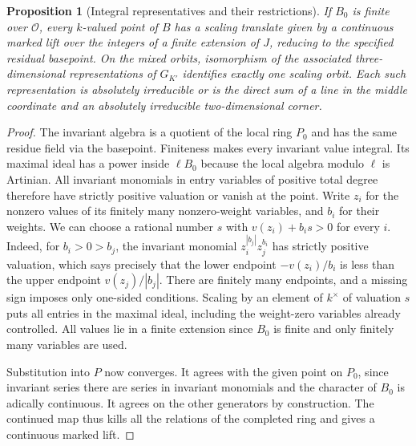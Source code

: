 \documentclass[a4paper,11pt]{article}
\newtheorem{proposition}{Proposition}[section]
\theoremstyle{definition}
\theoremstyle{remark}
\numberwithin{equation}{section}
\newcommand{\OO}{\mathcal O}
\begin{document}
\begin{proposition}[Integral representatives and their restrictions]\label{prop:point39}
If \(B_0\) is finite over \(\OO\), every \(k\)-valued point of \(B\) has a scaling translate given by a continuous marked lift over the integers of a finite extension of \(J\), reducing to the specified residual basepoint. On the mixed orbits, isomorphism of the associated three-dimensional representations of \(G_{K'}\) identifies exactly one scaling orbit. Each such representation is absolutely irreducible or is the direct sum of a line in the middle coordinate and an absolutely irreducible two-dimensional corner.
\end{proposition}
\begin{proof}
The invariant algebra is a quotient of the local ring \(P_0\) and has the same residue field via the basepoint. Finiteness makes every invariant value integral. Its maximal ideal has a power inside \(\ell B_0\) because the local algebra modulo \(\ell\) is Artinian. All invariant monomials in entry variables of positive total degree therefore have strictly positive valuation or vanish at the point. Write \(z_i\) for the nonzero values of its finitely many nonzero-weight variables, and \(b_i\) for their weights. We can choose a rational number \(s\) with \(v(z_i)+b_i s>0\) for every \(i\). Indeed, for \(b_i>0>b_j\), the invariant monomial \(z_i^{|b_j|}z_j^{b_i}\) has strictly positive valuation, which says precisely that the lower endpoint \(-v(z_i)/b_i\) is less than the upper endpoint \(v(z_j)/|b_j|\). There are finitely many endpoints, and a missing sign imposes only one-sided conditions. Scaling by an element of \(k^\times\) of valuation \(s\) puts all entries in the maximal ideal, including the weight-zero variables already controlled. All values lie in a finite extension since \(B_0\) is finite and only finitely many variables are used.

Substitution into \(P\) now converges. It agrees with the given point on \(P_0\), since invariant series there are series in invariant monomials and the character of \(B_0\) is adically continuous. It agrees on the other generators by construction. The continued map thus kills all the relations of the completed ring and gives a continuous marked lift.


\end{proof}
\end{document}
